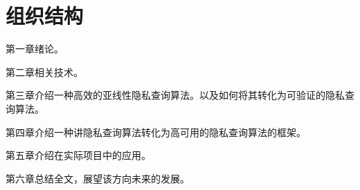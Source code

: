 \section{组织结构}

第一章绪论。

第二章相关技术。

第三章介绍一种高效的亚线性隐私查询算法。以及如何将其转化为可验证的隐私查询算法。

第四章介绍一种讲隐私查询算法转化为高可用的隐私查询算法的框架。

第五章介绍在实际项目中的应用。

第六章总结全文，展望该方向未来的发展。